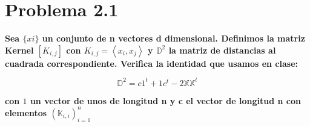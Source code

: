 \section*{Problema 2.1}

\textbf{Sea $\{x i \}$ un conjunto de n vectores d dimensional. Definimos la matriz Kernel $[K_{i,j}]$ con $K_{i,j} = \left\langle x_i , x_j \right\rangle$ y $\mathbb{D}^2$ la matriz de distancias al cuadrada correspondiente. Verifica la identidad que usamos en clase:}

\begin{equation*}
    \mathbb{D}^2 = c1^t+1c^t-2\mathbb{X}\mathbb{X}^t
\end{equation*}

\textbf{con $1$ un vector de unos de longitud n y c el vector de longitud n con elementos $(\mathbb{K}_{i,i})^n_{i=1}$}
